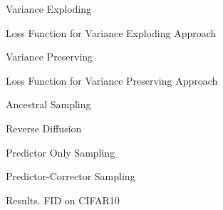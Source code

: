 \documentclass[xcolor=dvipsnames]{beamer}
\begin{document}
    \begin{frame}{Variance Exploding}
        
    \end{frame}

    \begin{frame}{Loss Function for Variance Exploding Approach}
    \end{frame}

    \begin{frame}{Variance Preserving}
    \end{frame}

    \begin{frame}{Loss Function for Variance Preserving Approach}
    \end{frame}

    \begin{frame}{Ancestral Sampling}
    \end{frame}

    \begin{frame}{Reverse Diffusion}
    \end{frame}

    \begin{frame}{Predictor Only Sampling}
    \end{frame}

    \begin{frame}{Predictor-Corrector Sampling}
    \end{frame}

    \begin{frame}{Results. FID on CIFAR10}
    \end{frame}


    
\end{document}
